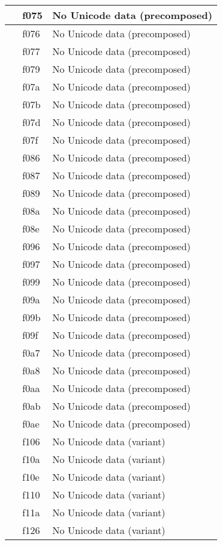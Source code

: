 \documentclass[12pt,letterpaper,openany]{book}
\begin{document}
\begin{center}
\begin{supertabular}{|m{0.25in}|m{0.5in}|m{4in}|}
 & f075 & No Unicode data (precomposed)\\\hline
 & f076 & No Unicode data (precomposed)\\\hline
 & f077 & No Unicode data (precomposed)\\\hline
 & f079 & No Unicode data (precomposed)\\\hline
 & f07a & No Unicode data (precomposed)\\\hline
 & f07b & No Unicode data (precomposed)\\\hline
 & f07d & No Unicode data (precomposed)\\\hline
 & f07f & No Unicode data (precomposed)\\\hline
 & f086 & No Unicode data (precomposed)\\\hline
 & f087 & No Unicode data (precomposed)\\\hline
 & f089 & No Unicode data (precomposed)\\\hline
 & f08a & No Unicode data (precomposed)\\\hline
 & f08e & No Unicode data (precomposed)\\\hline
 & f096 & No Unicode data (precomposed)\\\hline
 & f097 & No Unicode data (precomposed)\\\hline
 & f099 & No Unicode data (precomposed)\\\hline
 & f09a & No Unicode data (precomposed)\\\hline
 & f09b & No Unicode data (precomposed)\\\hline
 & f09f & No Unicode data (precomposed)\\\hline
 & f0a7 & No Unicode data (precomposed)\\\hline
 & f0a8 & No Unicode data (precomposed)\\\hline
 & f0aa & No Unicode data (precomposed)\\\hline
 & f0ab & No Unicode data (precomposed)\\\hline
 & f0ae & No Unicode data (precomposed)\\\hline
 & f106 & No Unicode data (variant)\\\hline
 & f10a & No Unicode data (variant)\\\hline
 & f10e & No Unicode data (variant)\\\hline
 & f110 & No Unicode data (variant)\\\hline
 & f11a & No Unicode data (variant)\\\hline
 & f126 & No Unicode data (variant)\\\hline

\end{supertabular}
\end{center}
\end{document}
